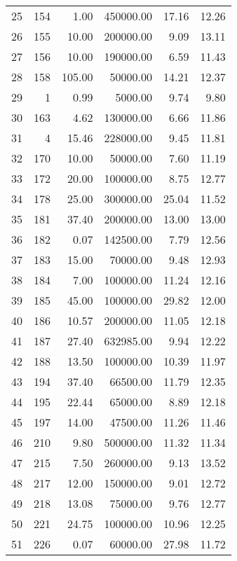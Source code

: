 \begin{tabular}{rrrrrr}
    25 &    154 &   1.00 & 450000.00 &  17.16 & 12.26 \\
    26 &    155 &  10.00 & 200000.00 &   9.09 & 13.11 \\
    27 &    156 &  10.00 & 190000.00 &   6.59 & 11.43 \\
    28 &    158 & 105.00 &  50000.00 &  14.21 & 12.37 \\
    29 &      1 &   0.99 &   5000.00 &   9.74 &  9.80 \\
    30 &    163 &   4.62 & 130000.00 &   6.66 & 11.86 \\
    31 &      4 &  15.46 & 228000.00 &   9.45 & 11.81 \\
    32 &    170 &  10.00 &  50000.00 &   7.60 & 11.19 \\
    33 &    172 &  20.00 & 100000.00 &   8.75 & 12.77 \\
    34 &    178 &  25.00 & 300000.00 &  25.04 & 11.52 \\
    35 &    181 &  37.40 & 200000.00 &  13.00 & 13.00 \\
    36 &    182 &   0.07 & 142500.00 &   7.79 & 12.56 \\
    37 &    183 &  15.00 &  70000.00 &   9.48 & 12.93 \\
    38 &    184 &   7.00 & 100000.00 &  11.24 & 12.16 \\
    39 &    185 &  45.00 & 100000.00 &  29.82 & 12.00 \\
    40 &    186 &  10.57 & 200000.00 &  11.05 & 12.18 \\
    41 &    187 &  27.40 & 632985.00 &   9.94 & 12.22 \\
    42 &    188 &  13.50 & 100000.00 &  10.39 & 11.97 \\
    43 &    194 &  37.40 &  66500.00 &  11.79 & 12.35 \\
    44 &    195 &  22.44 &  65000.00 &   8.89 & 12.18 \\
    45 &    197 &  14.00 &  47500.00 &  11.26 & 11.46 \\
    46 &    210 &   9.80 & 500000.00 &  11.32 & 11.34 \\
    47 &    215 &   7.50 & 260000.00 &   9.13 & 13.52 \\
    48 &    217 &  12.00 & 150000.00 &   9.01 & 12.72 \\
    49 &    218 &  13.08 &  75000.00 &   9.76 & 12.77 \\
    50 &    221 &  24.75 & 100000.00 &  10.96 & 12.25 \\
    51 &    226 &   0.07 &  60000.00 &  27.98 & 11.72 \\

\end{tabular}
